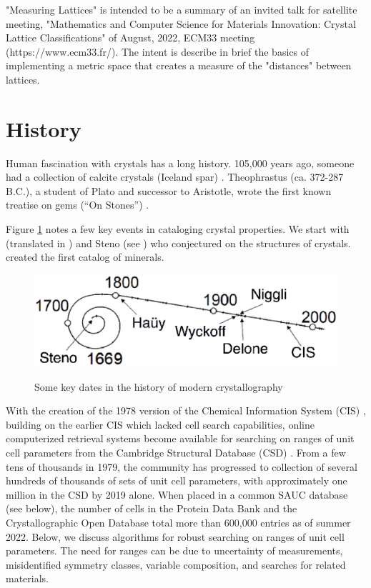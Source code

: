 \documentclass[preprint]{iucr}              %
\numberwithin{equation}{section}
\begin{document}
	"Measuring Lattices" is intended to be a summary of an invited talk
	for satellite meeting, "Mathematics and Computer Science for Materials Innovation: Crystal Lattice Classifications" of August, 2022, ECM33
	meeting (https://www.ecm33.fr/). The intent is describe in brief
	the basics of implementing a metric space that creates
	a measure of the "distances" between lattices.
	
	\section{History}
	
	Human fascination with crystals has a long history. 105,000 years ago,
	someone had a collection of calcite crystals 
	(Iceland spar) \cite{wilkins2021innovative}. 
	Theophrastus (ca. 372-287 B.C.), a student of Plato and successor to Aristotle, wrote the first known treatise on gems (``On Stones'')  \cite{enwiki:1114534722}.
	
	Figure \ref{timeline} notes a few key events in cataloging 
	crystal properties. We start with  (translated in ) and Steno  (see ) who
	conjectured on the structures of crystals.   created the first catalog of minerals.
	
\begin{figure}
	\includegraphics[width=\textwidth]{TimeLine_rev}
	\label{timeline}
	\caption{Some key dates in the history of modern crystallography}
\end{figure}

	With the creation of the 1978 version of the Chemical Information System (CIS)  \cite{bernstein1979nih},
	building on the earlier CIS \cite{feldmann1972application} which lacked cell search capabilities,
	online computerized retrieval systems become
	available for searching on ranges of unit cell parameters from
	the Cambridge Structural Database (CSD) \cite{kennard1977computer}. From 
	a few tens of thousands in 1979, the community has progressed to 
	collection of several hundreds of thousands of sets of
	unit cell parameters, with approximately one million in the
	CSD by 2019 \cite{taylor2019million} alone.  When placed in
	a common SAUC database (see below), the number of cells in the 
	Protein Data Bank and the Crystallographic Open Database total
	more than 600,000 entries as of summer 2022.   Below, we discuss algorithms for 
	robust searching on ranges of unit cell parameters. The need for
	ranges can be due to uncertainty of measurements, misidentified
	symmetry classes, variable composition, and searches for
	related materials.
	
\end{document}
